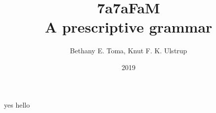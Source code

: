 \documentclass[8pt]{extbook}
\title{7a7aFaM \\ A prescriptive grammar}
\author{Bethany E. Toma, Knut F. K. Ulstrup}
\date{2019}
\begin{document}
\maketitle

yes hello
\end{document}
